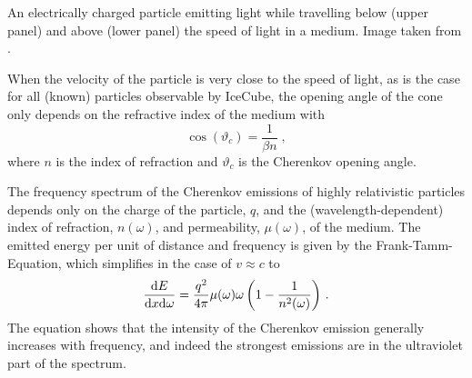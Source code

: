 \begin{marginfigure}[*-20]
    \caption{An electrically charged particle emitting light while travelling below (upper panel) and above (lower panel) the speed of light in a medium. Image taken from \cite{jackson2012classical}.}
    \label{fig:cherenkov-sketch}
\end{marginfigure}
When the velocity of the particle is very close to the speed of light, as is the case for all (known) particles observable by IceCube, the opening angle of the cone only depends on the refractive index of the medium with
\begin{equation}
    \cos(\vartheta_c)=\frac{1}{\beta n}\;,
\end{equation}
where $n$ is the index of refraction and $\vartheta_c$ is the Cherenkov opening angle.

The frequency spectrum of the Cherenkov emissions of highly relativistic particles depends only on the charge of the particle, $q$, and the (wavelength-dependent) index of refraction, $n(\omega)$, and permeability, $\mu(\omega)$, of the medium.
The emitted energy per unit of distance and frequency is given by the Frank-Tamm-Equation, which simplifies in the case of $v\approx c$ to
\begin{equation}
    \frac{\mathrm{d} E}{\mathrm{d} x \mathrm{d} \omega}=\frac{q^2}{4\pi}\mu(\omega)\omega\left(1-\frac{1}{n^2(\omega)}\right)\,.
\end{equation}
The equation shows that the intensity of the Cherenkov emission generally increases with frequency, and indeed the strongest emissions are in the ultraviolet part of the spectrum.

